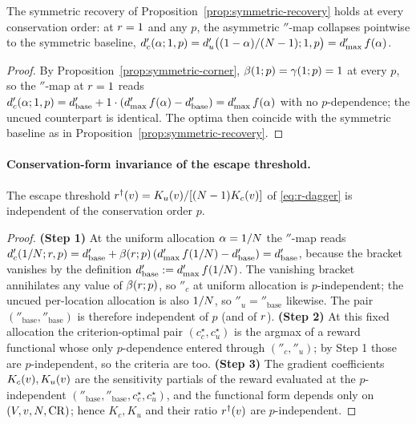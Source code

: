 \begin{corollary}
\label{cor:symmetric-invariance}
The symmetric recovery of Proposition~\ref{prop:symmetric-recovery} holds
at every conservation order: at $r = 1$ and any $p$, the asymmetric
$\dprime$-map collapses pointwise to the symmetric baseline,
$d'_c(\alpha; 1, p) = d'_u\big((1 - \alpha)/(N - 1); 1, p\big)
= d'_{\max}\, f(\alpha)$.
\end{corollary}

\begin{proof}
By Proposition~\ref{prop:symmetric-corner},
$\beta(1; p) = \gamma(1; p) = 1$ at every $p$, so the $\dprime$-map at
$r = 1$ reads $d'_c(\alpha; 1, p) = d'_{\mathrm{base}} +
1 \cdot (d'_{\max}\, f(\alpha) - d'_{\mathrm{base}}) = d'_{\max}\,
f(\alpha)$ with no $p$-dependence; the uncued counterpart is identical.
The optima then coincide with the symmetric baseline as in
Proposition~\ref{prop:symmetric-recovery}.
\end{proof}

\paragraph{Conservation-form invariance of the escape threshold.}
\begin{proposition}
\label{prop:escape-invariance}
The escape threshold $r^{\dagger}(v) = K_u(v)/[(N - 1) K_c(v)]$
of \eqref{eq:r-dagger} is independent of the conservation order $p$.
\end{proposition}

\begin{proof}
\textbf{(Step 1)} At the uniform allocation $\alpha = 1/N$ the
$\dprime$-map reads
$d'_c(1/N; r, p) = d'_{\mathrm{base}} +
\beta(r; p)\,(d'_{\max}\, f(1/N) - d'_{\mathrm{base}})
= d'_{\mathrm{base}}$, because the bracket vanishes by the
definition $d'_{\mathrm{base}} := d'_{\max}\, f(1/N)$. The
vanishing bracket annihilates any value of $\beta(r; p)$, so
$\dprime_c$ at uniform allocation is $p$-independent; the uncued
per-location allocation is also $1/N$, so $\dprime_u =
\dprime_{\mathrm{base}}$ likewise. The pair
$(\dprime_{\mathrm{base}}, \dprime_{\mathrm{base}})$ is therefore
independent of $p$ (and of $r$).
\textbf{(Step 2)} At this fixed allocation the criterion-optimal pair
$(c_c^\star, c_u^\star)$ is the argmax of a reward functional whose only
$p$-dependence entered through $(\dprime_c, \dprime_u)$; by Step 1 those
are $p$-independent, so the criteria are too.
\textbf{(Step 3)} The gradient coefficients $K_c(v), K_u(v)$ are
the sensitivity partials of the reward evaluated at the $p$-independent
$(\dprime_{\mathrm{base}}, \dprime_{\mathrm{base}}, c_c^\star, c_u^\star)$,
and the functional form depends only on $(V, v, N, \mathrm{CR})$;
hence $K_c, K_u$ and their ratio $r^{\dagger}(v)$ are $p$-independent.
\end{proof}

